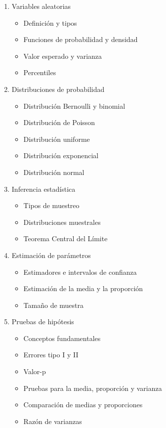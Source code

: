 \documentclass[12pt]{article}
\begin{document}
\begin{enumerate}
    \item{Variables aleatorias}
    \begin{itemize}
        \item Definición y tipos
        \item Funciones de probabilidad y densidad
        \item Valor esperado y varianza
        \item Percentiles
    \end{itemize}

    \item{Distribuciones de probabilidad}
    \begin{itemize}
        \item Distribución Bernoulli y binomial
        \item Distribución de Poisson
        \item Distribución uniforme
        \item Distribución exponencial
        \item Distribución normal
    \end{itemize}

    \item{Inferencia estadística}
    \begin{itemize}
        \item Tipos de muestreo
        \item Distribuciones muestrales
        \item Teorema Central del Límite
    \end{itemize}
    
    \item{Estimación de parámetros}
    \begin{itemize}
        \item Estimadores e intervalos de confianza
        \item Estimación de la media y la proporción
        \item Tamaño de muestra
    \end{itemize}

    \item{Pruebas de hipótesis}
    \begin{itemize}
        \item Conceptos fundamentales
        \item Errores tipo I y II
        \item Valor-p
        \item Pruebas para la media, proporción y varianza
        \item Comparación de medias y proporciones
        \item Razón de varianzas
    \end{itemize}


\end{enumerate}
\end{document}
